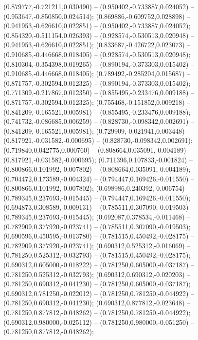  (0.879777,-0.721211,0.030490) -- (0.950402,-0.733887,0.024052) -- (0.953647,-0.850850,0.024514);
 (0.869886,-0.609752,0.028898) -- (0.941953,-0.626610,0.022851) -- (0.950402,-0.733887,0.024052);
 (0.854320,-0.511154,0.026393) -- (0.928574,-0.530513,0.020948) -- (0.941953,-0.626610,0.022851);
 (0.833687,-0.426722,0.023073) -- (0.910685,-0.446668,0.018405) -- (0.928574,-0.530513,0.020948);
 (0.810304,-0.354398,0.019265) -- (0.890194,-0.373303,0.015402) -- (0.910685,-0.446668,0.018405);
 (0.789492,-0.285204,0.015687) -- (0.871757,-0.302594,0.012325) -- (0.890194,-0.373303,0.015402);
 (0.771309,-0.217867,0.012350) -- (0.855495,-0.233476,0.009188) -- (0.871757,-0.302594,0.012325);
 (0.755468,-0.151852,0.009218) -- (0.841209,-0.165521,0.005981) -- (0.855495,-0.233476,0.009188);
 (0.741732,-0.086685,0.006259) -- (0.828730,-0.098342,0.002691) -- (0.841209,-0.165521,0.005981);
 (0.729909,-0.021941,0.003448) -- (0.817921,-0.031582,-0.000695) -- (0.828730,-0.098342,0.002691);
 (0.719840,0.042775,0.000760) -- (0.808664,0.035091,-0.004189) -- (0.817921,-0.031582,-0.000695);
 (0.711396,0.107833,-0.001824) -- (0.800866,0.101992,-0.007802) -- (0.808664,0.035091,-0.004189);
 (0.704472,0.173589,-0.004324) -- (0.794447,0.169426,-0.011550) -- (0.800866,0.101992,-0.007802);
 (0.698986,0.240392,-0.006754) -- (0.789345,0.237693,-0.015445) -- (0.794447,0.169426,-0.011550);
 (0.694873,0.308589,-0.009131) -- (0.785511,0.307090,-0.019503) -- (0.789345,0.237693,-0.015445);
 (0.692087,0.378534,-0.011468) -- (0.782909,0.377920,-0.023741) -- (0.785511,0.307090,-0.019503);
 (0.690596,0.450595,-0.013780) -- (0.781515,0.450492,-0.028175) -- (0.782909,0.377920,-0.023741);
 (0.690312,0.525312,-0.016069) -- (0.781250,0.525312,-0.032793) -- (0.781515,0.450492,-0.028175);
 (0.690312,0.605000,-0.018222) -- (0.781250,0.605000,-0.037187) -- (0.781250,0.525312,-0.032793);
 (0.690312,0.690312,-0.020203) -- (0.781250,0.690312,-0.041230) -- (0.781250,0.605000,-0.037187);
 (0.690312,0.781250,-0.022012) -- (0.781250,0.781250,-0.044922) -- (0.781250,0.690312,-0.041230);
 (0.690312,0.877812,-0.023648) -- (0.781250,0.877812,-0.048262) -- (0.781250,0.781250,-0.044922);
 (0.690312,0.980000,-0.025112) -- (0.781250,0.980000,-0.051250) -- (0.781250,0.877812,-0.048262);
